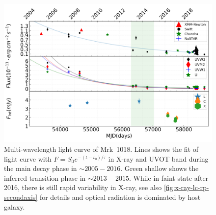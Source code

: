 \documentclass[twocolumn]{aastex63}
\begin{document}
\begin{figure}
\centering
	\includegraphics[width=\textwidth]{./pic/subplots-xrt_uvot-radio-second.png}
    \caption{Multi-wavelength light curve of Mrk~1018. Lines shows the fit of light curve with $F=S_0 e^{-(t-t_0)/\tau }$ in X-ray and UVOT band during the main decay phase in $\sim2005-2016$. Green shallow shows the inferred transition phase in $\sim2013-2015$.  While in faint state after 2016, there is still rapid variability in X-ray, see also \autoref{fig:x-ray-lc-rp-secondaxis} for details and optical radiation is dominated by host galaxy.}
    \label{fig:multi-lc-secondaxis}
\end{figure}
\end{document}
